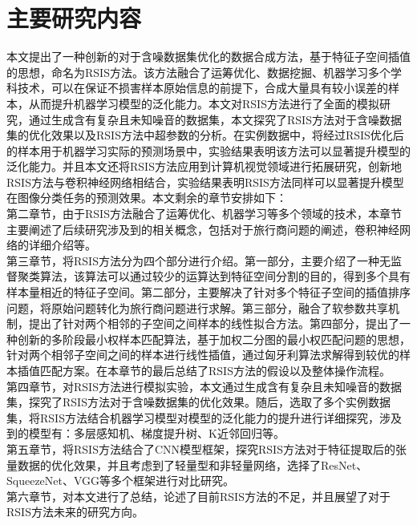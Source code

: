 \documentclass{NauThesis}
\begin{document}
\section{主要研究内容}
本文提出了一种创新的对于含噪数据集优化的数据合成方法，基于特征子空间插值的思想，命名为RSIS方法。该方法融合了运筹优化、数据挖掘、机器学习多个学科技术，可以在保证不损害样本原始信息的前提下，合成大量具有较小误差的样本，从而提升机器学习模型的泛化能力。本文对RSIS方法进行了全面的模拟研究，通过生成含有复杂且未知噪音的数据集，本文探究了RSIS方法对于含噪数据集的优化效果以及RSIS方法中超参数的分析。在实例数据中，将经过RSIS优化后的样本用于机器学习实际的预测场景中，实验结果表明该方法可以显著提升模型的泛化能力。并且本文还将RSIS方法应用到计算机视觉领域进行拓展研究，创新地RSIS方法与卷积神经网络相结合，实验结果表明RSIS方法同样可以显著提升模型在图像分类任务的预测效果。本文剩余的章节安排如下：
\\\hspace*{2em}第二章节，由于RSIS方法融合了运筹优化、机器学习等多个领域的技术，本章节主要阐述了后续研究涉及到的相关概念，包括对于旅行商问题的阐述，卷积神经网络的详细介绍等。
\\\hspace*{2em}第三章节，将RSIS方法分为四个部分进行介绍。第一部分，主要介绍了一种无监督聚类算法，该算法可以通过较少的运算达到特征空间分割的目的，得到多个具有样本量相近的特征子空间。第二部分，主要解决了针对多个特征子空间的插值排序问题，将原始问题转化为旅行商问题进行求解。第三部分，融合了软参数共享机制，提出了针对两个相邻的子空间之间样本的线性拟合方法。第四部分，提出了一种创新的多阶段最小权样本匹配算法，基于加权二分图的最小权匹配问题的思想，针对两个相邻子空间之间的样本进行线性插值，通过匈牙利算法求解得到较优的样本插值匹配方案。在本章节的最后总结了RSIS方法的假设以及整体操作流程。
\\\hspace*{2em}第四章节，对RSIS方法进行模拟实验，本文通过生成含有复杂且未知噪音的数据集，探究了RSIS方法对于含噪数据集的优化效果。随后，选取了多个实例数据集，将RSIS方法结合机器学习模型对模型的泛化能力的提升进行详细探究，涉及到的模型有：多层感知机、梯度提升树、K近邻回归等。
\\\hspace*{2em}第五章节，将RSIS方法结合了CNN模型框架，探究RSIS方法对于特征提取后的张量数据的优化效果，并且考虑到了轻量型和非轻量网络，选择了ResNet、SqueezeNet、VGG等多个框架进行对比研究。
\\\hspace*{2em}第六章节，对本文进行了总结，论述了目前RSIS方法的不足，并且展望了对于RSIS方法未来的研究方向。
\end{document}
